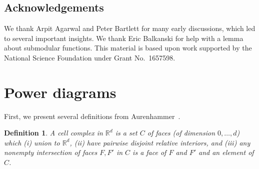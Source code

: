 \documentclass[12pt]{article}
\newcommand{\Comments}{1}
\newcommand{\mynote}[2]{\ifnum\Comments=1\textcolor{#1}{#2}\fi}
\newcommand{\raf}[1]{\mynote{green}{[RF: #1]}}
\newcommand{\jessie}[1]{\mynote{purple}{[JF: #1]}}
\newcommand{\reals}{\mathbb{R}}
\newtheorem{conjecture}{Conjecture}
\newtheorem{definition}{Definition}
\begin{document}



\subsection*{Acknowledgements}
We thank Arpit Agarwal and Peter Bartlett for many early discussions, which led to several important insights.
We thank Eric Balkanski for help with a lemma about submodular functions. %
This material is based upon work supported by the National Science Foundation under Grant No.\ 1657598.
\newpage



\appendix

\newpage
\section{Power diagrams}
First, we present several definitions from Aurenhammer~\cite{aurenhammer1987power}.
\begin{definition}\label{def:cell-complex}
  A \emph{cell complex} in $\reals^d$ is a set $C$ of faces (of dimension $0,\ldots,d$) which (i) union to $\reals^d$, (ii) have pairwise disjoint relative interiors, and (iii) any nonempty intersection of faces $F,F'$ in $C$ is a face of $F$ and $F'$ and an element of $C$.
\end{definition}
\end{document}

